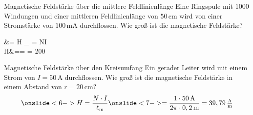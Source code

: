 \begin{frame} 
	\begin{bsp}{Magnetische Feldstärke über die mittlere Feldlinienlänge}{}
		\b{Eine Ringspule mit $1000$ Windungen und einer mittleren Feldlinienlänge von $50\,\mathrm{cm}$ wird von einer Stromstärke von $100\,\mathrm{mA}$ durchflossen. Wie groß ist die magnetische Feldstärke?}%
		\begin{eqa}
			\varTheta &= H \cdot \ell_{} = N\cdot I\nonumber\\
			\onslide<3->H&=\onslide<4->= = 200\,\nonumber
			\onslide<1->
		\end{eqa}
	\end{bsp}
	
	\begin{bsp}{Magnetische Feldstärke über den Kreisumfang}{}
		Ein gerader Leiter wird mit einem Strom von $I=50\,\mathrm{A}$ durchflossen. Wie groß ist die magnetische Feldstärke in einem Abstand von $r=20\,\mathrm{cm}$?
		\begin{equation*}
			\onslide<6->H=\frac{N\cdot I}{\ell_{\mathrm{m}}}\onslide<7->=\frac{1\cdot50\,\mathrm{A}}{2\pi\cdot 0,2\,\mathrm{m}} = 39,79\,\tfrac{\mathrm{A}}{\mathrm{m}}
		\end{equation*}
	\end{bsp}
\end{frame}

